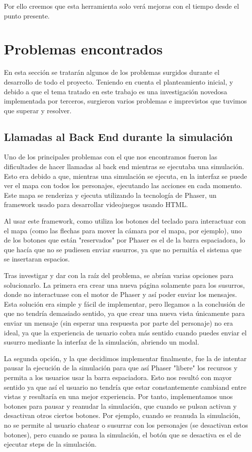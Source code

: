Por ello creemos que esta herramienta solo verá mejoras con el tiempo desde el punto presente.

\section{Problemas encontrados}

En esta sección se tratarán algunos de los problemas surgidos durante el desarrollo de todo el proyecto. Teniendo en cuenta el planteamiento inicial, y debido a que el tema tratado en este trabajo es una investigación novedosa implementada por terceros, surgieron varios problemas e imprevistos que tuvimos que superar y resolver.

\subsection{Llamadas al Back End durante la simulación}

Uno de los principales problemas con el que nos encontramos fueron las dificultades de hacer llamadas al back end mientras se ejecutaba una simulación. Esto era debido a que, mientras una simulación se ejecuta, en la interfaz se puede ver el mapa con todos los personajes, ejecutando las acciones en cada momento. Este mapa se renderiza y ejecuta utilizando la tecnología de Phaser, un framework usado para desarrollar videojuegos usando HTML.

Al usar este framework, como utiliza los botones del teclado para interactuar con el mapa (como las flechas para mover la cámara por el mapa, por ejemplo), uno de los botones que están "reservados" por Phaser es el de la barra espaciadora, lo que hacía que no se pudiesen enviar susurros, ya que no permitía el sistema que se insertaran espacios.

Tras investigar y dar con la raíz del problema, se abrían varias opciones para solucionarlo. La primera era crear una nueva página solamente para los susurros, donde no interactuase con el motor de Phaser y así poder enviar los mensajes. Esta solución era simple y fácil de implementar, pero llegamos a la conclusión de que no tendría demasiado sentido, ya que crear una nueva vista únicamente para enviar un mensaje (sin esperar una respuesta por parte del personaje) no era ideal, ya que la experiencia de usuario cobra más sentido cuando puedes enviar el susurro mediante la interfaz de la simulación, abriendo un modal.

La segunda opción, y la que decidimos implementar finalmente, fue la de intentar pausar la ejecución de la simulación para que así Phaser "libere" los recursos y permita a los usuarios usar la barra espaciadora. Esto nos resultó con mayor sentido ya que así el usuario no tendría que estar constantemente cambiand entre vistas y resultaría en una mejor experiencia. Por tanto, implementamos unos botones para pausar y reanudar la simulación, que cuando se pulsan activan y desactivan otros ciertos botones. Por ejemplo, cuando se reanuda la simulación, no se permite al usuario chatear o susurrar con los personajes (se desactivan estos botones), pero cuando se pausa la simulación, el botón que se desactiva es el de ejecutar steps de la simulación.

